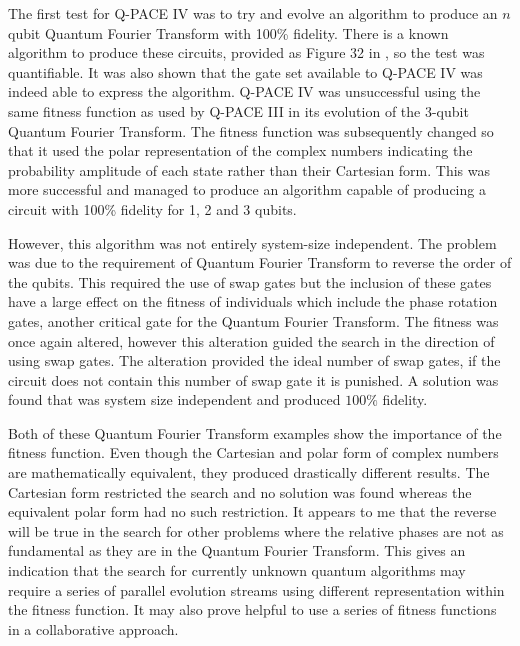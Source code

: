 
The first test for Q-PACE IV was to try and evolve an algorithm to produce an $n$ qubit Quantum Fourier Transform with 100\% fidelity.
There is a known algorithm to produce these circuits, provided as Figure 32 in \cite{masseythesis}, so the test was quantifiable.
It was also shown that the gate set available to Q-PACE IV was indeed able to express the algorithm.
Q-PACE IV was unsuccessful using the same fitness function as used by Q-PACE III in its evolution of the 3-qubit Quantum Fourier Transform.
The fitness function was subsequently changed so that it used the polar representation of the complex numbers indicating the probability amplitude of each state rather than their Cartesian form.
This was more successful and managed to produce an algorithm capable of producing a circuit with 100\% fidelity for 1, 2 and 3 qubits.

However, this algorithm was not entirely system-size independent.
The problem was due to the requirement of Quantum Fourier Transform to reverse the order of the qubits.
This required the use of swap gates but the inclusion of these gates have a large effect on the fitness of individuals which include the phase rotation gates, another critical gate for the Quantum Fourier Transform.
The fitness was once again altered, however this alteration guided the search in the direction of using swap gates.
The alteration provided the ideal number of swap gates, if the circuit does not contain this number of swap gate it is punished.
A solution was found that was system size independent and produced $100\%$ fidelity.

Both of these Quantum Fourier Transform examples show the importance of the fitness function.
Even though the Cartesian and polar form of complex numbers are mathematically equivalent, they produced drastically different results.
The Cartesian form restricted the search and no solution was found whereas the equivalent polar form had no such restriction.
It appears to me that the reverse will be true in the search for other problems where the relative phases are not as fundamental as they are in the Quantum Fourier Transform.
This gives an indication that the search for currently unknown quantum algorithms may require a series of parallel evolution streams using different representation within the fitness function.
It may also prove helpful to use a series of fitness functions in a collaborative approach.

